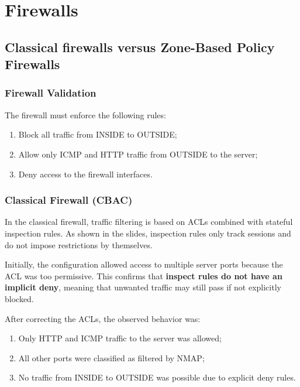 \documentclass[12pt]{article}
\begin{document}

\newpage

\section{Firewalls}

\subsection{Classical firewalls versus Zone-Based Policy Firewalls}

\subsubsection{Firewall Validation}

The firewall must enforce the following rules:
\begin{enumerate}
    \item Block all traffic from INSIDE to OUTSIDE;
    \item Allow only ICMP and HTTP traffic from OUTSIDE to the server;
    \item Deny access to the firewall interfaces.
\end{enumerate}

\subsubsection{Classical Firewall (CBAC)}

In the classical firewall, traffic filtering is based on ACLs combined with stateful inspection rules. As shown in the slides, inspection rules only track sessions and do not impose restrictions by themselves.

Initially, the configuration allowed access to multiple server ports because the ACL was too permissive. This confirms that \textbf{inspect rules do not have an implicit deny}, meaning that unwanted traffic may still pass if not explicitly blocked.

After correcting the ACLs, the observed behavior was:
\begin{enumerate}
    \item Only HTTP and ICMP traffic to the server was allowed;
    \item All other ports were classified as filtered by NMAP;
    \item No traffic from INSIDE to OUTSIDE was possible due to explicit deny rules.
\end{enumerate}
\end{document}
